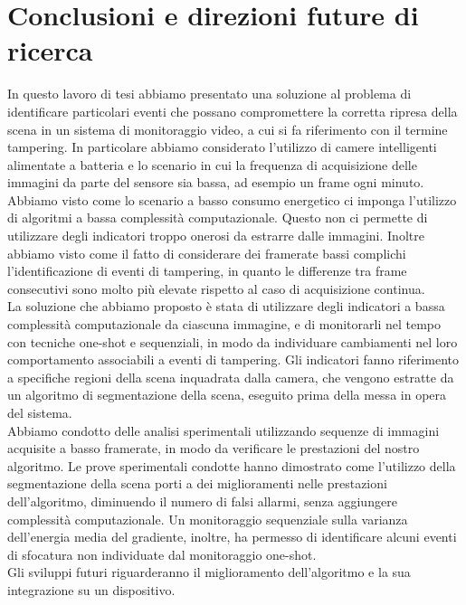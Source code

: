 \chapter{Conclusioni e direzioni future di ricerca}
\label{Conclusioni}
\thispagestyle{empty}

\noindent In questo lavoro di tesi abbiamo presentato una soluzione al problema di identificare particolari eventi che possano compromettere la corretta ripresa della scena in un sistema di monitoraggio video, a cui si fa riferimento con il termine tampering.
In particolare abbiamo considerato l'utilizzo di camere intelligenti alimentate a batteria e lo scenario in cui la frequenza di acquisizione delle immagini da parte del sensore sia bassa, ad esempio un frame ogni minuto.\\
Abbiamo visto come lo scenario a basso consumo energetico ci imponga l'utilizzo di algoritmi a bassa complessit\`a computazionale. Questo non ci permette di utilizzare degli indicatori troppo onerosi da estrarre dalle immagini.
Inoltre abbiamo visto come il fatto di considerare dei framerate bassi complichi l'identificazione di eventi di tampering, in quanto le differenze tra frame consecutivi sono molto pi\`u elevate rispetto al caso di acquisizione continua. \\
La soluzione che abbiamo proposto \`e stata di utilizzare degli indicatori a bassa complessit\`a computazionale da ciascuna immagine, e di monitorarli nel tempo con tecniche one-shot e sequenziali, in modo da individuare cambiamenti nel loro comportamento associabili a eventi di tampering.
Gli indicatori fanno riferimento a specifiche regioni della scena inquadrata dalla camera, che vengono estratte da un algoritmo di segmentazione della scena, eseguito prima della messa in opera del sistema.\\
Abbiamo condotto delle analisi sperimentali utilizzando sequenze di immagini acquisite a basso framerate, in modo da verificare le prestazioni del nostro algoritmo.
Le prove sperimentali condotte hanno dimostrato come l'utilizzo della segmentazione della scena porti a dei miglioramenti nelle prestazioni dell'algoritmo, diminuendo il numero di falsi allarmi, senza aggiungere complessit\`a computazionale.
Un monitoraggio sequenziale sulla varianza dell'energia media del gradiente, inoltre, ha permesso di identificare alcuni eventi di sfocatura non individuate dal monitoraggio one-shot.\\
Gli sviluppi futuri riguarderanno il miglioramento dell'algoritmo e la sua integrazione su un dispositivo.
